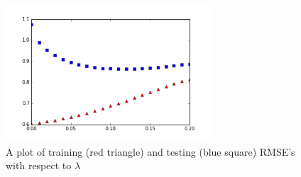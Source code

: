 \documentclass{article} %
\begin{document}
\begin{figure}[h]
\centering
\includegraphics[width=3in]{../plot.png}
\caption{\label{fig:rmselambda} A plot of
training (red triangle) and testing (blue square) RMSE's with respect to $\lambda$ }
\end{figure}









{}
\end{document}
